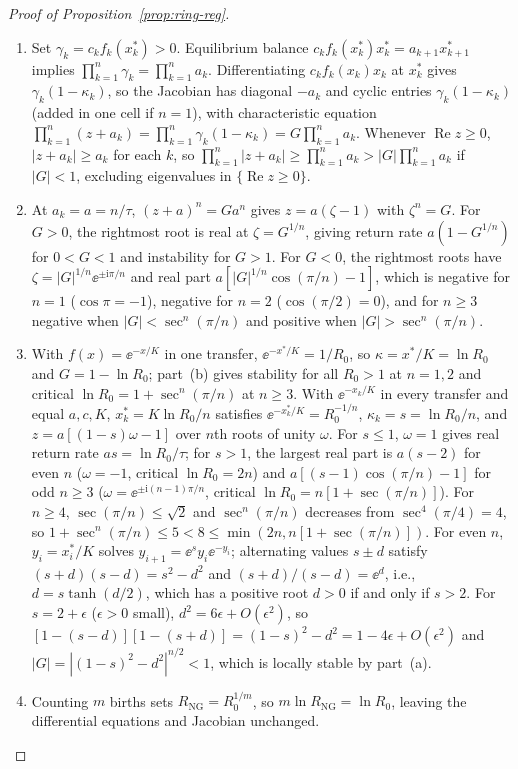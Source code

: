 \begin{proof}[Proof of Proposition~{\upshape\ref{prop:ring-reg}}]
\begin{enumerate}
\item[(a)] Set $\gamma_k = c_k f_k(x_k^*) > 0$. Equilibrium balance $c_k f_k(x_k^*) x_k^* = a_{k+1} x_{k+1}^*$ implies $\prod_{k=1}^n \gamma_k = \prod_{k=1}^n a_k$. Differentiating $c_k f_k(x_k) x_k$ at $x_k^*$ gives $\gamma_k(1 - \kappa_k)$, so the Jacobian has diagonal $-a_k$ and cyclic entries $\gamma_k(1 - \kappa_k)$ (added in one cell if $n = 1$), with characteristic equation $\prod_{k=1}^n (z + a_k) = \prod_{k=1}^n \gamma_k(1 - \kappa_k) = G\prod_{k=1}^n a_k$. Whenever $\operatorname{Re} z \ge 0$, $|z + a_k| \ge a_k$ for each $k$, so $\prod_{k=1}^n |z + a_k| \ge \prod_{k=1}^n a_k > |G|\prod_{k=1}^n a_k$ if $|G| < 1$, excluding eigenvalues in $\{\operatorname{Re} z \ge 0\}$.
\item[(b)] At $a_k = a = n/\tau$, $(z + a)^n = G a^n$ gives $z = a(\zeta - 1)$ with $\zeta^n = G$. For $G > 0$, the rightmost root is real at $\zeta = G^{1/n}$, giving return rate $a(1 - G^{1/n})$ for $0 < G < 1$ and instability for $G > 1$. For $G < 0$, the rightmost roots have $\zeta = |G|^{1/n}\ee^{\pm\mathrm{i}\pi/n}$ and real part $a[|G|^{1/n}\cos(\pi/n) - 1]$, which is negative for $n = 1$ ($\cos\pi = -1$), negative for $n = 2$ ($\cos(\pi/2) = 0$), and for $n \ge 3$ negative when $|G| < \sec^n(\pi/n)$ and positive when $|G| > \sec^n(\pi/n)$.
\item[(c)] With $f(x) = \ee^{-x/K}$ in one transfer, $\ee^{-x^*/K} = 1/R_0$, so $\kappa = x^*/K = \ln R_0$ and $G = 1 - \ln R_0$; part~(b) gives stability for all $R_0 > 1$ at $n = 1, 2$ and critical $\ln R_0 = 1 + \sec^n(\pi/n)$ at $n \ge 3$. With $\ee^{-x_k/K}$ in every transfer and equal $a, c, K$, $x_k^* = K\ln R_0 / n$ satisfies $\ee^{-x_k^*/K} = R_0^{-1/n}$, $\kappa_k = s = \ln R_0 / n$, and $z = a[(1 - s)\omega - 1]$ over $n$th roots of unity $\omega$. For $s \le 1$, $\omega = 1$ gives real return rate $as = \ln R_0 / \tau$; for $s > 1$, the largest real part is $a(s - 2)$ for even $n$ ($\omega = -1$, critical $\ln R_0 = 2n$) and $a[(s - 1)\cos(\pi/n) - 1]$ for odd $n \ge 3$ ($\omega = \ee^{\pm\mathrm{i}(n-1)\pi/n}$, critical $\ln R_0 = n[1 + \sec(\pi/n)]$). For $n \ge 4$, $\sec(\pi/n) \le \sqrt{2}$ and $\sec^n(\pi/n)$ decreases from $\sec^4(\pi/4) = 4$, so $1 + \sec^n(\pi/n) \le 5 < 8 \le \min(2n, n[1 + \sec(\pi/n)])$. For even $n$, $y_i = x_i^*/K$ solves $y_{i+1} = \ee^s y_i \ee^{-y_i}$; alternating values $s \pm d$ satisfy $(s + d)(s - d) = s^2 - d^2$ and $(s + d)/(s - d) = \ee^d$, i.e., $d = s\tanh(d/2)$, which has a positive root $d > 0$ if and only if $s > 2$. For $s = 2 + \epsilon$ ($\epsilon > 0$ small), $d^2 = 6\epsilon + O(\epsilon^2)$, so $[1 - (s - d)][1 - (s + d)] = (1 - s)^2 - d^2 = 1 - 4\epsilon + O(\epsilon^2)$ and $|G| = |(1 - s)^2 - d^2|^{n/2} < 1$, which is locally stable by part~(a).
\item[(d)] Counting $m$ births sets $R_{\mathrm{NG}} = R_0^{1/m}$, so $m\ln R_{\mathrm{NG}} = \ln R_0$, leaving the differential equations and Jacobian unchanged. \qedhere
\end{enumerate}
\end{proof}

